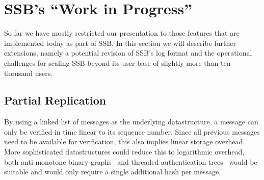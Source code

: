 \documentclass[10pt,sigconf,rewiew]{acmart}
\begin{document}


\section{SSB's ``Work in Progress''}
\label{sec:wip}

So far we have mostly restricted our presentation to those features that are implemented today as part of SSB. In this section we will describe further extensions, namely a potential revision of SSB's log format and the operational challenges for scaling SSB beyond its user base of slightly more than ten thousand users.


\subsection{Partial Replication}

By using a linked list of messages as the underlying datastructure, a message can only be verified in time linear to its sequence number. Since all previous messages need to be available for verification, this also implies linear storage overhead. More sophisticated datastructures could reduce this to logarithmic overhead, both anti-monotone binary graphs~\cite{buldas1998new} and threaded authentication trees~\cite{buldas2000optimally} would be suitable and would only require a single additional hash per message.
\end{document}
